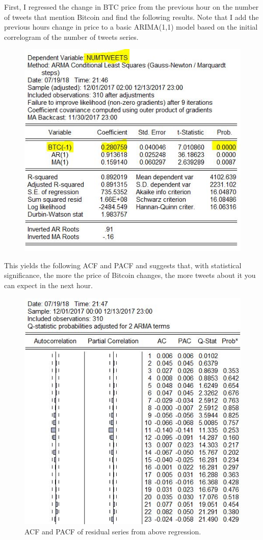 \documentclass{article}
\begin{document}
	First, I regressed the change in BTC price from the previous hour on the number of tweets that mention Bitcoin and find the following results. Note that I add the previous hours change in price to a basic ARIMA(1,1) model based on the initial correlogram of the number of tweets series. 
	\begin{figure}[H]
	\centering
	\includegraphics[width = .9\textwidth]{numTweetsRegResults.JPG}
	\end{figure}
	
	This yields the following ACF and PACF and suggests that, with statistical significance, the more the price of Bitcoin changes, the more tweets about it you can expect in the next hour. 
	
	\begin{figure}[H]
	\centering
	\includegraphics[width = .9\textwidth]{ACF_PACF.JPG}
	\caption{ACF and PACF of residual series from above regression.}
	\end{figure}
	
\end{document}
